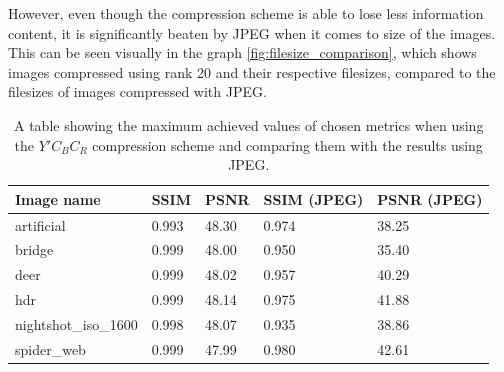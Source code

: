 \documentclass[thesis=M,english]{FITthesis}[2012/10/20]
\begin{document}
However, even though the compression scheme is able to lose less information content, it is significantly
beaten by JPEG when it comes to size of the images. This can be seen visually in the graph \ref{fig:filesize_comparison},
which shows images compressed using rank 20 and their respective filesizes, compared to the filesizes of images
compressed with JPEG.

\begin{table}[]
\centering
\begin{tabular}{|l|l|l|l|l|}
\hline
\textbf{Image name}  & \textbf{SSIM} & \textbf{PSNR} & \textbf{SSIM (JPEG)} & \textbf{PSNR (JPEG)} \\ \hline
artificial           & 0.993             & 48.30             & 0.974                & 38.25                \\ \hline
bridge               & 0.999             & 48.00             & 0.950                & 35.40                \\ \hline
deer                 & 0.999             & 48.02             & 0.957                & 40.29                \\ \hline
hdr                  & 0.999             & 48.14             & 0.975                & 41.88                \\ \hline
nightshot\_iso\_1600 & 0.998             & 48.07             & 0.935                & 38.86                \\ \hline
spider\_web          & 0.999             & 47.99             & 0.980                & 42.61                \\ \hline
\end{tabular}
\caption[Maximum achieved SSIM/PSNR values and comparison to JPEG]{A table showing the maximum achieved values of chosen metrics when using
         the $Y'C_BC_R$ compression scheme and comparing them with the results using
         JPEG.}
\label{tab:ycbcrvsjpeg}
\end{table}
\end{document}
